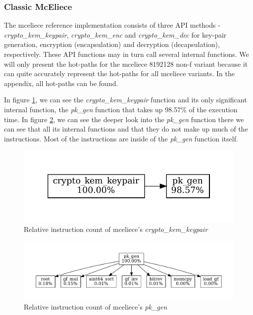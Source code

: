 \subsubsection{Classic McEliece}
The \gls{mceliece} reference implementation consists of three API methods - \textit{crypto\_kem\_keypair}, \textit{crypto\_kem\_enc} and \textit{crypto\_kem\_dec} for key-pair generation, encryption (encapsulation) and decryption (decapsulation), respectively. These API functions may in turn call several internal functions. We will only present the hot-paths for the \gls{mceliece} 8192128 non-f variant because it can quite accurately represent the hot-paths for all \gls{mceliece} variants. In the appendix, all hot-paths can be found. 

In figure \ref{figure:result:hot-paths:classic-mceliece:crypto_kem_keypair}, we can see the \textit{crypto\_kem\_keypair} function and its only significant internal function, the \textit{pk\_gen} function that takes up 98.57\% of the execution time. In figure \ref{figure:result:hot-paths:classic-mceliece:pk_gen}, we can see the deeper look into the \textit{pk\_gen} function there we can see that all its internal functions and that they do not make up much of the instructions. Most of the instructions are inside of the \textit{pk\_gen} function itself.

\begin{figure}[H]
    \centering
    \includegraphics[scale=0.5]{chapters/results/hot-paths/classic-mceliece/8192128/crypto_kem_keypair.pdf}
    \caption{Relative instruction count of \gls{mceliece}'s \textit{crypto\_kem\_keypair}}
    \label{figure:result:hot-paths:classic-mceliece:crypto_kem_keypair}
\end{figure}

\begin{figure}[H]
    \centering
    \includegraphics[scale=0.5]{chapters/results/hot-paths/classic-mceliece/8192128/pk_gen.pdf}
    \caption{Relative instruction count of \gls{mceliece}'s \textit{pk\_gen}}
    \label{figure:result:hot-paths:classic-mceliece:pk_gen}
\end{figure}

